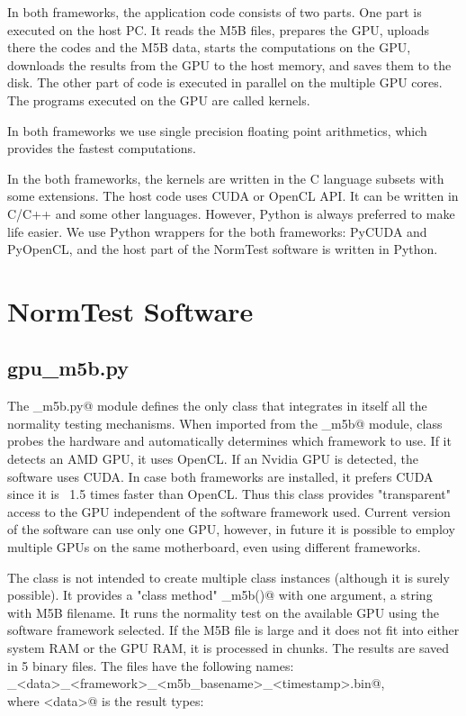 \documentclass[letterpaper,twoside,12pt]{article}
\begin{document}
In both frameworks, the application code consists of two parts. One part is executed on the host PC. It reads the M5B files, prepares the GPU, uploads there the codes and the M5B data, starts the computations on the GPU, downloads the results from the GPU to the host memory, and saves them to the disk. The other part of code is executed in parallel on the multiple GPU cores. The programs executed on the GPU are called kernels. 

In both frameworks we use single precision floating point arithmetics, which provides the fastest computations.

In the both frameworks, the kernels are written in the C language subsets with some extensions. The host code uses CUDA or OpenCL API. It can be written in C/C++ and some other languages. However, Python is always preferred to make life easier. We use Python wrappers for the both frameworks: PyCUDA and PyOpenCL, and the host part of the NormTest software is written in Python. 


\section{NormTest Software}

\subsection{gpu\_m5b.py}

The \verb@gpu_m5b.py@ module defines the only class \verb@Normtest@ that integrates in itself all the normality testing mechanisms. When imported from the \verb@gpu_m5b@ module, \verb@Normtest@ class probes the hardware and automatically determines which framework to use. If it detects an AMD GPU, it uses OpenCL. If an Nvidia GPU is detected, the software uses CUDA. In case both frameworks are installed, it prefers CUDA since it is ~1.5 times faster than OpenCL. Thus this class provides "transparent" access to the GPU independent of the software framework used. Current version of the software can use only one GPU, however, in future it is possible to employ multiple GPUs on the same motherboard, even using different frameworks. 

The \verb@Normtest@ class is not intended to create multiple class instances (although it is surely possible). It provides a "class method" \verb@do_m5b()@ with one argument, a string with M5B filename. It runs the normality test on the available GPU using the software framework selected. If the M5B file is large and it does not fit into either system RAM or the GPU RAM, it is processed in chunks. The results are saved in 5 binary files.  The files have the following names: \\
    \verb@nt_<data>_<framework>_<m5b_basename>_<timestamp>.bin@, \\
where \verb@<data>@ is the result types: \\
\end{document}
